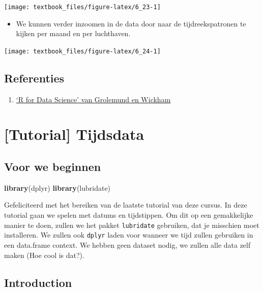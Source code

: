 \documentclass[]{tufte-book}
\newenvironment{Shaded}{}{}
\newcommand{\KeywordTok}[1]{\textcolor[rgb]{0.00,0.44,0.13}{\textbf{#1}}}
\newcommand{\NormalTok}[1]{#1}
\providecommand{\tightlist}{%
  \setlength{\itemsep}{0pt}\setlength{\parskip}{0pt}}
\begin{document}
\texttt{[image: textbook\_files/figure-latex/6\_23-1]}

\begin{itemize}
\tightlist
\item
  We kunnen verder inzoomen in de data door naar de tijdreekspatronen te kijken per maand en per luchthaven.
\end{itemize}

\texttt{[image: textbook\_files/figure-latex/6\_24-1]}

\hypertarget{referenties-5}{%
\section{Referenties}\label{referenties-5}}

\begin{enumerate}
\def\labelenumi{\arabic{enumi}.}
\tightlist
\item
  \href{http://r4ds.had.co.nz/}{`R for Data Science' van Grolemund en Wickham}
\end{enumerate}

\hypertarget{tutorial-tijdsdata}{%
\chapter{{[}Tutorial{]} Tijdsdata}\label{tutorial-tijdsdata}}

\hypertarget{voor-we-beginnen}{%
\section{Voor we beginnen}\label{voor-we-beginnen}}

\begin{Shaded}
\begin{Highlighting}[]
\KeywordTok{library}\NormalTok{(dplyr) }
\KeywordTok{library}\NormalTok{(lubridate)}
\end{Highlighting}
\end{Shaded}

Gefeliciteerd met het bereiken van de laatste tutorial van deze cursus. In deze tutorial gaan we spelen met datums en tijdstippen. Om dit op een gemakkelijke manier te doen, zullen we het pakket \texttt{lubridate} gebruiken, dat je misschien moet installeren. We zullen ook \texttt{dplyr} laden voor wanneer we tijd zullen gebruiken in een data.frame context. We hebben geen dataset nodig, we zullen alle data zelf maken (Hoe cool is dat?).

\hypertarget{introduction}{%
\section{Introduction}\label{introduction}}
\end{document}
